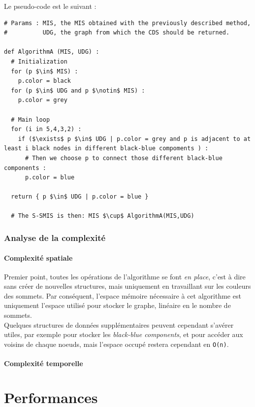 \documentclass[]{report}
\let\oldparagraph\paragraph
\renewcommand{\paragraph}[1]{\oldparagraph{#1}\mbox{}}
\begin{document}
Le pseudo-code est le suivant :

\begin{lstlisting}
# Params : MIS, the MIS obtained with the previously described method,
#          UDG, the graph from which the CDS should be returned.
    
def AlgorithmA (MIS, UDG) : 
  # Initialization
  for (p $\in$ MIS) :
    p.color = black
  for (p $\in$ UDG and p $\notin$ MIS) :
    p.color = grey
    
  # Main loop
  for (i in 5,4,3,2) :
    if ($\exists$ p $\in$ UDG | p.color = grey and p is adjacent to at least i black nodes in different black-blue compoments ) :
      # Then we choose p to connect those different black-blue components :
      p.color = blue
      
  return { p $\in$ UDG | p.color = blue }
      
  # The S-SMIS is then: MIS $\cup$ AlgorithmA(MIS,UDG) 
\end{lstlisting}

\subsubsection{Analyse de la
complexité}\label{analyse-de-la-complexituxe9}

\paragraph{Complexité spatiale}\label{complexituxe9-spatiale}

Premier point, toutes les opérations de l'algorithme se font \emph{en
place}, c'est à dire sans créer de nouvelles structures, mais uniquement
en travaillant sur les couleurs des sommets. Par conséquent, l'espace
mémoire nécessaire à cet algorithme est uniquement l'espace utilisé pour
stocker le graphe, linéaire en le nombre de sommets.\\
Quelques structures de données supplémentaires peuvent cependant
s'avérer utiles, par exemple pour stocker les \emph{black-blue
components}, et pour accéder aux voisins de chaque noeuds, mais l'espace
occupé restera cependant en \lstinline!O(n)!.

\paragraph{Complexité temporelle}\label{complexituxe9-temporelle}

\section{Performances}\label{performances}
\end{document}
